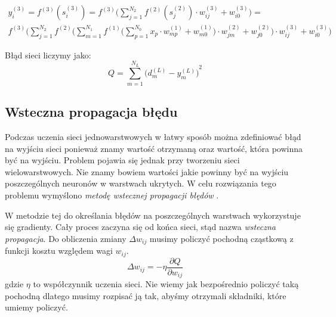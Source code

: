 \documentclass[a4paper,12pt]{article}
\numberwithin{equation}{section}
\begin{document}
\begin{equation}
\begin{aligned}
    y_i^{(3)} = f^{(3)}(s_i^{(3)}) = f^{(3)} \Big( \sum_{j=1}^{N_2} f^{(2)}(s_j^{(2)}) \cdot w_{ij}^{(3)} + w_{i0}^{(3)} \Big) = \\
    f^{(3)} \Big( \sum_{j=1}^{N_2} f^{(2)} \Big( \sum_{m=1}^{N_1} f^{(1)} \Big(\sum_{p=1}^{N_0} x_p \cdot w_{mp}^{(1)} + w_{m0}^{(1)} \Big) \cdot w_{jm}^{(2)} + w_{j0}^{(2)} \Big) \cdot w_{ij}^{(3)} + w_{i0}^{(3)} \Big)
\end{aligned}
\end{equation}

Błąd sieci liczymy jako:
\begin{equation}
    Q = \sum_{m=1}^{N_L}{\Big(d_m^{(L)}-y_m^{(L)}\Big)}^2
\end{equation}

\subsection{Wsteczna propagacja błędu}
Podczas uczenia sieci jednowarstwowych w łatwy sposób można zdefiniować błąd na wyjściu sieci ponieważ znamy wartość otrzymaną oraz wartość, która powinna być na wyjściu. Problem pojawia się jednak przy tworzeniu sieci wielowarstwowych. Nie znamy bowiem wartości jakie powinny być na wyjściu poszczególnych neuronów w warstwach ukrytych. W celu rozwiązania tego problemu wymyślono \textit{metodę wstecznej propagacji błędów} \cite{book_rutkowski}.

W metodzie tej do określania błędów na poszczególnych warstwach wykorzystuje się gradienty. Cały proces zaczyna się od końca sieci, stąd nazwa \textit{wsteczna propagacja}. Do obliczenia zmiany $\Delta w_{ij}$ musimy policzyć pochodną cząstkową z funkcji kosztu względem wagi $w_{ij}$.
\begin{equation}
    \label{eq:delta_w}
    \Delta w_{ij} = -\eta \frac{\partial Q}{\partial w_{ij}}
\end{equation}
gdzie $\eta$ to współczynnik uczenia sieci. Nie wiemy jak bezpośrednio policzyć taką pochodną dlatego musimy rozpisać ją tak, abyśmy otrzymali składniki, które umiemy policzyć.
\end{document}
